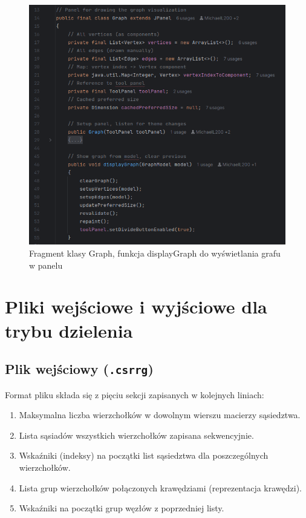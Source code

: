\documentclass{article}
\begin{document}
\begin{enumerate}
        \begin{figure}[H]
            \centering
            \includegraphics[width=1\linewidth]{img/Graph.png}
            \caption{Fragment klasy Graph, funkcja displayGraph do wyświetlania grafu w panelu}
            \label{fig:Graph}
        \end{figure}
        
    \end{enumerate}
        


\section{Pliki wejściowe i wyjściowe dla trybu dzielenia}

    \subsection{Plik wejściowy (\texttt{.csrrg})}
    
        Format pliku składa się z pięciu sekcji zapisanych w kolejnych liniach:
        \begin{enumerate}
            \item Maksymalna liczba wierzchołków w dowolnym wierszu macierzy sąsiedztwa.
            \item Lista sąsiadów wszystkich wierzchołków zapisana sekwencyjnie.
            \item Wskaźniki (indeksy) na początki list sąsiedztwa dla poszczególnych wierzchołków.
            \item Lista grup wierzchołków połączonych krawędziami (reprezentacja krawędzi).
            \item Wskaźniki na początki grup węzłów z poprzedniej listy.
        \end{enumerate}
\end{document}
